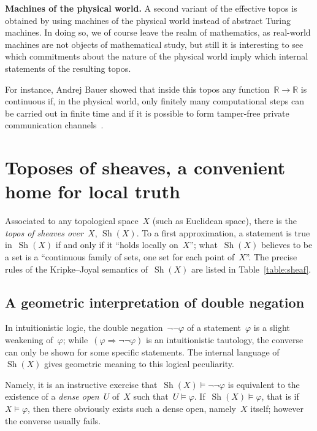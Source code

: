 \documentclass[oneside,reqno]{amsart}
\theoremstyle{definition}
\theoremstyle{plain}
\theoremstyle{remark}
\newcommand{\RR}{\mathbb{R}}
\DeclareMathOperator{\Sh}{Sh}
\renewcommand{\_}{\mathpunct{.}\,}
\newcommand{\effective}{ef{}fective\xspace}
\newcommand{\?}{\,{:}\,}
\renewcommand{\paragraph}[1]{\noindent\textbf{#1.}}
\begin{document}
\bigskip
\paragraph{Machines of the physical world} A second variant of the
\effective topos is obtained by using machines of the physical world
instead of abstract Turing machines. In doing so, we of
course leave the realm of mathematics, as real-world machines are not objects
of mathematical study, but still it is interesting to see which commitments
about the nature of the physical world imply which internal statements of the
resulting topos.

For instance, Andrej Bauer showed that inside this topos any function~$\RR \to
\RR$ is continuous if, in the physical world, only finitely many computational
steps can be carried out in finite time and if it is possible to form
tamper-free private communication channels~\cite{bauer:int-mathematics}.


\section{Toposes of sheaves, a convenient home for local truth}
\label{sect:sheaf-toposes}

Associated to any topological space~$X$ (such as Euclidean space), there is the
\emph{topos of sheaves over~$X$}, $\Sh(X)$. To a first approximation, a
statement is true in~$\Sh(X)$ if and only if it ``holds locally on~$X$'';
what~$\Sh(X)$ believes to be a set is a ``continuous family of sets, one set
for each point of~$X$''. The precise rules of the Kripke--Joyal semantics
of~$\Sh(X)$ are listed in Table~\ref{table:sheaf}.


\subsection{A geometric interpretation of double negation}
In intuitionistic logic, the double negation~$\neg\neg\varphi$ of a
statement~$\varphi$ is a slight weakening of~$\varphi$; while~$(\varphi
\Rightarrow \neg\neg\varphi)$ is an intuitionistic tautology, the converse can
only be shown for some specific statements. The internal language of~$\Sh(X)$
gives geometric meaning to this logical peculiarity.

Namely, it is an instructive exercise that~$\Sh(X) \models \neg\neg\varphi$ is equivalent to the
existence of a \emph{dense open}~$U$ of~$X$ such that~$U \models \varphi$.
If~$\Sh(X) \models \varphi$, that is if~$X \models \varphi$, then there
obviously exists such a dense open, namely~$X$ itself; however the converse
usually fails.
\end{document}
